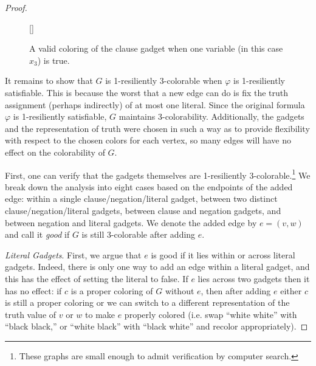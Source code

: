 \documentclass{llncs}
\begin{document}
\begin{proof}

\begin{figure}
[\FBwidth]
{\caption{A valid coloring of the clause gadget when one variable (in this case
$x_3$) is true.}\label{fig:clause-gadget-proof}}
{}
\end{figure}

It remains to show that $G$ is 1-resiliently 3-colorable when $\varphi$ is
1-resiliently satisfiable. This is because the worst that a new edge can do is
fix the truth assignment (perhaps indirectly) of at most one literal. Since the
original formula $\varphi$ is 1-resiliently satisfiable, $G$ maintains
3-colorability.  Additionally, the gadgets and the representation of truth were
chosen in such a way as to provide flexibility with respect to the chosen colors
for each vertex, so many edges will have no effect on the colorability of $G$. 

First, one can verify that the gadgets themselves are 1-resiliently
3-colorable.\footnote{These graphs are small enough to admit verification by
computer search.} We break down the analysis into eight cases based on the
endpoints of the added edge: within a single clause/negation/literal gadget,
between two distinct clause/negation/literal gadgets, between clause and
negation gadgets, and between negation and literal gadgets. We denote the added
edge by $e = (v,w)$ and call it \emph{good} if $G$ is still 3-colorable after
adding $e$. 

\emph{Literal Gadgets}. First, we argue that $e$ is good if it lies within or
across literal gadgets. Indeed, there is only one way to add an edge within a
literal gadget, and this has the effect of setting the literal to false. If $e$
lies across two gadgets then it has no effect: if $c$ is a proper coloring of
$G$ without $e$, then after adding $e$ either $c$ is still a proper coloring or
we can switch to a different representation of the truth value of $v$ or $w$ to
make $e$ properly colored (i.e. swap ``white white'' with ``black black,'' or
``white black'' with ``black white'' and recolor appropriately). 


\end{proof}
\end{document}
